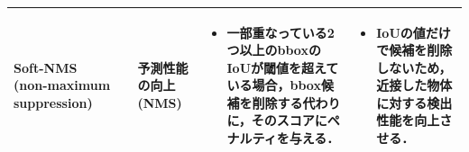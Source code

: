 \documentclass[originalpaper,fleqn]{jsaiart}     %
\begin{document}
\begin{table}
\begin{center}
\begin{tabularx}{\linewidth}{Xp{1.5cm}Xp{7cm}X}
            Soft-NMS (non-maximum suppression)
            & \cite{BSCD17} & 予測性能の向上 (NMS) & 
            \begin{itemize}
                \vspace{-0.7\baselineskip}
                \setlength{\leftskip}{-3mm}
                \item 一部重なっている2つ以上のbboxのIoUが閾値を超えている場合，bbox候補を削除する代わりに，そのスコアにペナルティを与える．
            \end{itemize}
            &
            \begin{itemize}
                \vspace{-0.7\baselineskip}
                \setlength{\leftskip}{-3mm}
                \item IoUの値だけで候補を削除しないため，近接した物体に対する検出性能を向上させる．
            \end{itemize}
            \\
            \bottomrule
        \end{tabularx}
    \end{center}
\end{table}%
\end{document}
